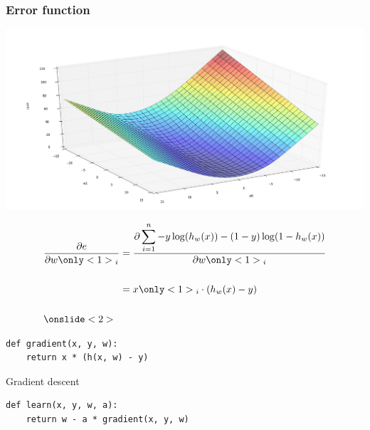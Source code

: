     \begin{frame}
      \frametitle{Error function}
      \begin{center}
        \includegraphics[scale=0.22]{./pictures/error_function.png}
      \end{center}
    \end{frame}

    \begin{frame}
      \begin{equation*}
        \begin{split}
          \frac{\partial e}{\partial w\only<1>{_i}} & = \frac{\partial \displaystyle\sum_{i =
        1}^n{-y \log(h_w(x)) - (1 - y) \log(1 -
      h_w(x)})}{\partial w\only<1>{_i}} \\~\\
      & = x\only<1>{_i} \cdot (h_w(x) - y)\\~\\
      \onslide<2>{~}
\end{split}
  \end{equation*}
\end{frame}

\begin{frame}[fragile]
  \begin{block}{}
    \begin{lstlisting}
def gradient(x, y, w):
    return x * (h(x, w) - y)
    \end{lstlisting}
  \end{block}
\end{frame}

\begin{frame}[fragile]
  \begin{block}{Gradient descent}
    \begin{lstlisting}
def learn(x, y, w, a):
    return w - a * gradient(x, y, w)
    \end{lstlisting}
  \end{block}
\end{frame}


